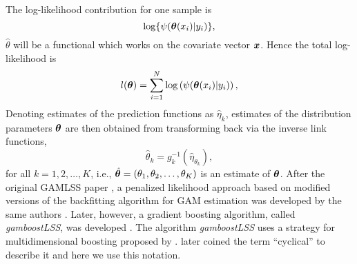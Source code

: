The log-likelihood contribution for one sample is
\begin{equation*}
    \log\{\psi(\boldsymbol{\theta}(x_i)|y_i)\},
\end{equation*}
$\hat{\theta}$ will be a functional which works on the covariate vector $\bm{x}$.
Hence the total log-likelihood is
\begin{equation*}
    l(\boldsymbol{\theta})=\sum_{i=1}^N\log\left(\psi(\boldsymbol{\theta}(x_i)|y_i)\right),
\end{equation*}
Denoting estimates of the prediction functions as $\hat{\eta}_k$, estimates of the distribution parameters $\boldsymbol{\theta}$ are then obtained from transforming back via the inverse link functions,
\begin{equation*}
    \hat{\theta}_k=g_k^{-1}(\hat{\eta}_{\theta_k}),
\end{equation*}
for all $k=1,2,\ldots,K$, i.e., $\hat{\boldsymbol{\theta}}=\left(\theta_1,\theta_2,\ldots,\theta_K\right)$ is an estimate of $\boldsymbol{\theta}$.
After the original GAMLSS paper \citep{gamlss}, a penalized likelihood approach based on modified versions of the backfitting algorithm for GAM estimation was developed by the same authors \citep{gamlssR}.
Later, however, a gradient boosting algorithm, called \textit{gamboostLSS}, was developed \citep{gamboostlss-paper}.
The algorithm \textit{gamboostLSS} uses a strategy for multidimensional boosting proposed by \citet{schmid}.
\citet{thomas2018} later coined the term ``cyclical'' to describe it and here we use this notation.


